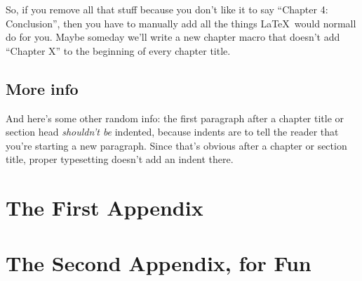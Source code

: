 \documentclass[12pt,twoside]{reedthesis}
\begin{document}
So, if you remove all that stuff because you don't like it to say ``Chapter 4: Conclusion'', then you have to manually add all the things \LaTeX\ would normall do for you. Maybe someday we'll write a new chapter macro that doesn't add ``Chapter X'' to the beginning of every chapter title.

\section{More info}
And here's some other random info: the first paragraph after a chapter title or section head \emph{shouldn't be} indented, because indents are to tell the reader that you're starting a new paragraph. Since that's obvious after a chapter or section title, proper typesetting doesn't add an indent there. 


    \appendix
      \chapter{The First Appendix}
      \chapter{The Second Appendix, for Fun}



  \backmatter %

%  

    

\end{document}
